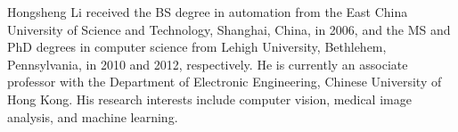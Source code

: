 \vspace{-3em}

\begin{IEEEbiography}{Hongsheng Li}
received the BS degree in automation from the East China University of Science and Technology, Shanghai, China, in 2006, and the MS and PhD degrees in computer science from Lehigh University, Bethlehem, Pennsylvania, in 2010 and 2012, respectively. He is currently an associate professor with the Department of Electronic Engineering, Chinese University of Hong Kong. His research interests include computer vision, medical image analysis, and machine learning.
\end{IEEEbiography}

